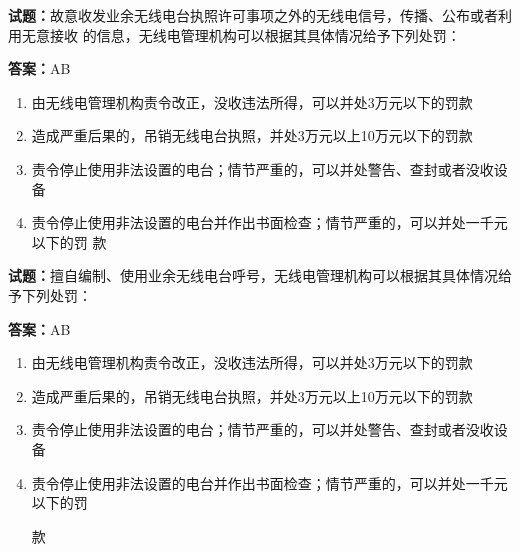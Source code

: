 \documentclass{ctexbook}
\begin{document}
\textbf{试题：}故意收发业余无线电台执照许可事项之外的无线电信号，传播、公布或者利用无意接收
的信息，无线电管理机构可以根据其具体情况给予下列处罚： 

\textbf{答案：}AB 

\begin{enumerate}[leftmargin=3em]
  \item 由无线电管理机构责令改正，没收违法所得，可以并处3万元以下的罚款 

  \item 造成严重后果的，吊销无线电台执照，并处3万元以上10万元以下的罚款 

  \item 责令停止使用非法设置的电台；情节严重的，可以并处警告、查封或者没收设备 

  \item 责令停止使用非法设置的电台并作出书面检查；情节严重的，可以并处一千元以下的罚
款 

\end{enumerate}





\vspace{1em}

\textbf{试题：}擅自编制、使用业余无线电台呼号，无线电管理机构可以根据其具体情况给予下列处罚： 

\textbf{答案：}AB 

\begin{enumerate}[leftmargin=3em]
  \item 由无线电管理机构责令改正，没收违法所得，可以并处3万元以下的罚款 

  \item 造成严重后果的，吊销无线电台执照，并处3万元以上10万元以下的罚款 

  \item 责令停止使用非法设置的电台；情节严重的，可以并处警告、查封或者没收设备 

  \item 责令停止使用非法设置的电台并作出书面检查；情节严重的，可以并处一千元以下的罚


款 

\end{enumerate}





\vspace{1em}
\end{document}
